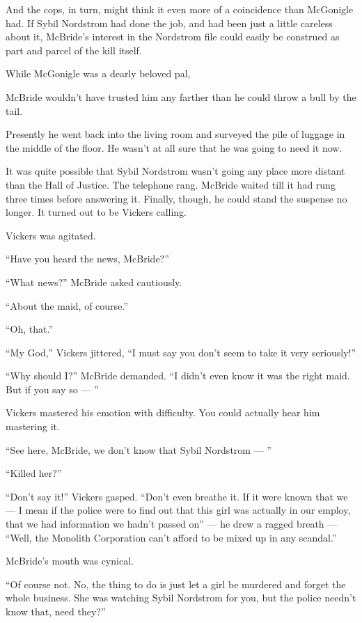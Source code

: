 \documentclass{novel}
\begin{document}
And the cops, in turn, might think it even more of a coincidence than McGonigle had. If Sybil Nordstrom had done the job, and had been just a little careless about it, McBride’s interest in the Nordstrom file could easily be construed as part and parcel of the kill itself.

While McGonigle was a dearly beloved pal, 

\noindent McBride wouldn’t have trusted him any farther than he could throw a bull by the tail.

Presently he went back into the living room and surveyed the pile of luggage in the middle of the floor. He wasn’t at all sure that he was going to need it now.

It was quite possible that Sybil Nordstrom wasn’t going any place more distant than the Hall of Justice. The telephone rang. McBride waited till it had rung three times before answering it. Finally, though, he could stand the suspense no longer. It turned out to be Vickers calling.

Vickers was agitated.

“Have you heard the news, McBride?”

“What news?” McBride asked cautiously.

“About the maid, of course.”

“Oh, that.”

“My God,” Vickers jittered, “I must say you don’t seem to take it very seriously!”

“Why should I?” McBride demanded. “I didn’t even know it was the right maid. But if you say so — ”

Vickers mastered his emotion with difficulty. You could actually hear him mastering it.

“See here, McBride, we don’t know that Sybil Nordstrom — ”

“Killed her?”

“Don’t say it!” Vickers gasped. “Don’t even breathe it. If it were known that we — I mean if the police were to find out that this girl was actually in our employ, that we had information we hadn’t passed on” — he drew a ragged breath — “Well, the Monolith Corporation can’t afford to be mixed up in any scandal.”

McBride’s mouth was cynical.

“Of course not. No, the thing to do is just let a girl be murdered and forget the whole business. She was watching Sybil Nordstrom for you, but the police needn’t know that, need they?”
\end{document}
